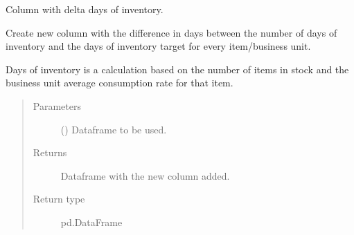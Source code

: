 \documentclass[letterpaper,10pt,english]{sphinxmanual}
\begin{document}

\begin{fulllineitems}
\label{\detokenize{source/optimization.datatools:optimization.datatools.dataprep.delta_days_of_inventory}}
Column with delta days of inventory.

Create new column with the difference in days between
the number of days of inventory and the days of inventory target for every
item/business unit.

Days of inventory is a calculation based on the number of items in stock
and the business unit average consumption rate for that item.
\begin{quote}\begin{description}
\item[{Parameters}] \leavevmode
{} () \textendash{} Dataframe to be used.

\item[{Returns}] \leavevmode
{} \textendash{} Dataframe with the new column added.

\item[{Return type}] \leavevmode
pd.DataFrame

\end{description}\end{quote}

\end{fulllineitems}

\end{document}

